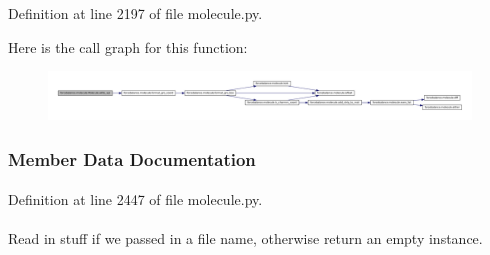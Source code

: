 \-Definition at line 2197 of file molecule.\-py.



\-Here is the call graph for this function\-:\nopagebreak
\begin{figure}[H]
\begin{center}
\leavevmode
\includegraphics[width=350pt]{classforcebalance_1_1molecule_1_1Molecule_adc6620e8287edabe161442de12295f75_cgraph}
\end{center}
\end{figure}




\subsubsection{\-Member \-Data \-Documentation}
\hypertarget{classforcebalance_1_1molecule_1_1Molecule_ac84c67d37f00c0f65e6fb6126e19f9bb}{
\paragraph[{boxes}]{}}\label{classforcebalance_1_1molecule_1_1Molecule_ac84c67d37f00c0f65e6fb6126e19f9bb}


\-Definition at line 2447 of file molecule.\-py.

\hypertarget{classforcebalance_1_1molecule_1_1Molecule_a5e092c726455a18c9300f5c5362121d8}{
\paragraph[{comms}]{}}\label{classforcebalance_1_1molecule_1_1Molecule_a5e092c726455a18c9300f5c5362121d8}


\-Read in stuff if we passed in a file name, otherwise return an empty instance. 

